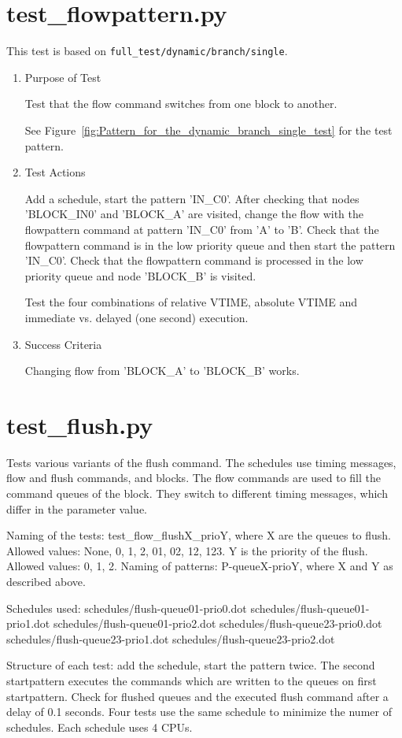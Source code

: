 \documentclass[12pt,a4paper]{report}
\begin{document}
\section{test\_flowpattern.py}
This test is based on \texttt{full\_test/dynamic/branch/single}.
\begin{enumerate}
  \item Purpose of Test

  Test that the flow command switches from one block to another.

  See Figure~\ref{fig:Pattern_for_the_dynamic_branch_single_test} for the test pattern.
  \item Test Actions

  Add a schedule, start the pattern 'IN\_C0'. After checking that nodes 'BLOCK\_IN0' and 'BLOCK\_A' are visited,
        change the flow with the flowpattern command at pattern 'IN\_C0' from 'A' to 'B'. Check that the flowpattern
        command is in the low priority queue and then start the pattern 'IN\_C0'. Check that the flowpattern
        command is processed in the low priority queue and node 'BLOCK\_B' is visited.

  Test the four combinations of relative VTIME, absolute VTIME and immediate vs. delayed (one second) execution.
  \item Success Criteria

  Changing flow from 'BLOCK\_A' to 'BLOCK\_B' works.
\end{enumerate}

\section{test\_flush.py}
Tests various variants of the flush command. The schedules use timing messages, flow and flush commands, and blocks.
The flow commands are used to fill the command queues of the block. They switch to different timing messages, which
differ in the parameter value.

Naming of the tests:
test\_flow\_flushX\_prioY, where
X are the queues to flush. Allowed values: None, 0, 1, 2, 01, 02, 12, 123.
Y is the priority of the flush. Allowed values: 0, 1, 2.
Naming of patterns:
P-queueX-prioY, where X and Y as described above.

Schedules used:
schedules/flush-queue01-prio0.dot
schedules/flush-queue01-prio1.dot
schedules/flush-queue01-prio2.dot
schedules/flush-queue23-prio0.dot
schedules/flush-queue23-prio1.dot
schedules/flush-queue23-prio2.dot

Structure of each test:
add the schedule, start the pattern twice. The second startpattern executes the commands which are written
to the queues on first startpattern.
Check for flushed queues and the executed flush command after a delay of 0.1 seconds.
Four tests use the same schedule to minimize the numer of schedules. Each schedule uses 4 CPUs.
\end{document}
